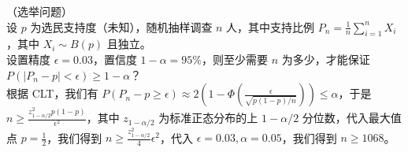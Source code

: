 \documentclass[../main.tex]{subfiles}
\begin{document}
\begin{example}
    （选举问题）\\
    设 $p$ 为选民支持度（未知），随机抽样调查 $n$ 人，其中支持比例 $P_n=\frac1n\sum_{i=1}^nX_i$，其中 $X_i\sim B(p)$ 且独立。\\
    设置精度 $\epsilon=0.03$，置信度 $1-\alpha=95\%$，则至少需要 $n$ 为多少，才能保证 $P(|P_n-p|<\epsilon)\geq1-\alpha$？\\
    根据 CLT，我们有 $P(P_n-p\geq\epsilon)\approx2\left(1-\Phi(\frac\epsilon{\sqrt{p(1-p)/n}})\right)\leq\alpha$，于是 $n\geq\frac{z_{1-\alpha/2}^2p(1-p)}{\epsilon^2}$，其中 $z_{1-\alpha/2}$ 为标准正态分布的上 $1-\alpha/2$ 分位数，代入最大值点 $p=\frac12$，我们得到 $n\geq\frac{z_{1-\alpha/2}^2}4\epsilon^2$，代入 $\epsilon=0.03,\alpha=0.05$，我们得到 $n\geq1068$。
\end{example}
\end{document}
